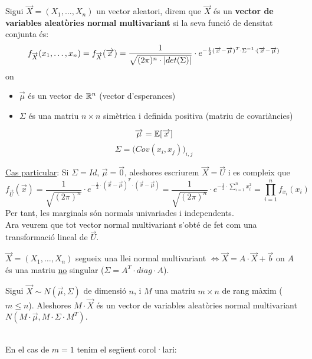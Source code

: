 \begin{defi}
  Sigui $\overrightarrow{X}=(X_{1},\ldots,X_{n})$ un vector aleatori, direm que $\overrightarrow{X}$ és un \textbf{vector de variables aleatòries normal multivariant} si la seva funció de densitat conjunta és:
  \[
    f_{\overrightarrow{X}}(x_{1},\ldots,x_{n}) = f_{\overrightarrow{X}}(\overrightarrow{x}) = \frac{1}{\sqrt{(2\pi)^{n}\cdot \left\vert det(\Sigma) \right\vert}}\cdot e^{-\frac{1}{2}(\overrightarrow{x}-\overrightarrow{\mu})^{T}\cdot \Sigma^{-1} \cdot (\overrightarrow{x}-\overrightarrow{\mu})}
  \]
  on
  \begin{itemize}
      \item  $\overrightarrow{\mu}$ és un vector de $\mathbb{R}^{n}$ (vector d'esperances)
      \item $\Sigma$ és una matriu $n\times n$ simètrica i definida positiva (matriu de covariàncies)
  \end{itemize}
  \[
    \overrightarrow{\mu} = \mathbb{E}[\overrightarrow{x}]
  \]
  \[
    \Sigma = \Big( Cov(x_{i},x_{j})\Big)_{i,j}
  \]
\end{defi}

\underline{Cas particular}: Si $\Sigma = Id$, $\overrightarrow{\mu} = \overrightarrow{0}$, aleshores escriurem $\overrightarrow{X}=\overrightarrow{U}$ i es compleix que 
\[
f_{\overrightarrow{U}}(\overrightarrow{x}) = \frac{1}{\sqrt{(2\pi)^{n}}}\cdot e^{-\frac{1}{2}\cdot(\overrightarrow{x}-\overrightarrow{\mu})^{T}\cdot  (\overrightarrow{x}-\overrightarrow{\mu})} = \frac{1}{\sqrt{(2\pi)^{n}}}\cdot e^{-\frac{1}{2}\cdot\sum\limits_{i=1}^{n}x_{i}^{2}} = \prod_{i=1}^{n} f_{x_{i}}(x_{i})
\]
Per tant, les marginals són normals univariades i independents. \\

Ara veurem que tot vector normal multivariant s'obté de fet com una transformació lineal de $\overrightarrow{U}$.

\begin{thm}
  $\overrightarrow{X}=(X_{1},\ldots,X_{n})$ segueix una llei normal multivariant $\iff \overrightarrow{X} = A\cdot\overrightarrow{X} + \overrightarrow{b}$ on $A$ és una matriu \underline{no} singular ($\Sigma = A^{T}\cdot diag \cdot A$).
\end{thm}

\begin{thm}
  Sigui $\overrightarrow{X}\sim N(\overrightarrow{\mu}, \Sigma)$ de dimensió $n$, i $M$ una matriu $m\times n$ de rang màxim ($m\leq n$). Aleshores $M\cdot\overrightarrow{X}$ és un vector de variables aleatòries normal multivariant $N(M\cdot\overrightarrow{\mu}, M\cdot\Sigma\cdot M^{T})$.
\end{thm}
\-\\
En el cas de $m = 1$ tenim el següent corol·lari:

